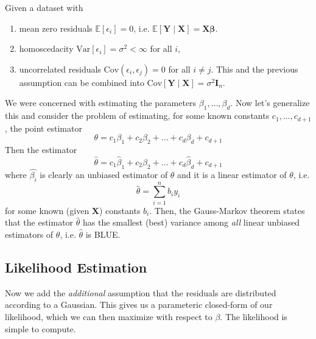   \begin{theorem}
    \label{thm:gauss-markov-theorem}
    Given a dataset with 
    \begin{enumerate}
      \item mean zero residuals $\mathbb{E}[\epsilon_i] = 0$, i.e. $\mathbb{E}[\mathbf{Y} \mid \mathbf{X}] = \mathbf{X} \boldsymbol{\beta}$. 
      \item homoscedacity $\mathrm{Var}[\epsilon_i] = \sigma^2 < \infty$ for all $i$, 
      \item uncorrelated residuals $\mathrm{Cov}(\epsilon_i, \epsilon_j) = 0$ for all $i \neq j$. This and the previous assumption can be combined into $\mathrm{Cov}[\mathbf{Y} \mid \mathbf{X}] = \sigma^2 \mathbf{I}_n$. 
    \end{enumerate}
    We were concerned with estimating the parameters $\beta_1, \ldots, \beta_d$. Now let's generalize this and consider the problem of estimating, for some known constants $c_1, \ldots, c_{d+1}$, the point estimator 
    \begin{equation}
      \theta = c_1 \beta_1 + c_2 \beta_2 + \ldots + c_d \beta_d + c_{d+1}
    \end{equation}
    Then the estimator 
    \begin{equation}
      \hat{\theta} = c_1 \hat{\beta}_1 + c_2 \hat{\beta}_2 + \ldots + c_d \hat{\beta}_d + c_{d+1}
    \end{equation}
    where $\hat{\beta_i}$ is clearly an unbiased estimator of $\theta$ and it is a linear estimator of $\theta$, i.e. 
    \begin{equation}
      \hat{\theta} = \sum_{i=1}^n b_i y_i
    \end{equation}
    for some known (given $\mathbf{X}$) constants $b_i$. Then, the Gauss-Markov theorem states that the estimator $\hat{\theta}$ has the smallest (best) variance among \textit{all} linear unbiased estimators of $\theta$, i.e. $\hat{\theta}$ is BLUE. 
  \end{theorem}

\subsection{Likelihood Estimation}

  Now we add the \textit{additional} assumption that the residuals are distributed according to a Gaussian. This gives us a parameteric closed-form of our likelihood, which we can then maximize with respect to $\beta$. The likelihood is simple to compute. 


